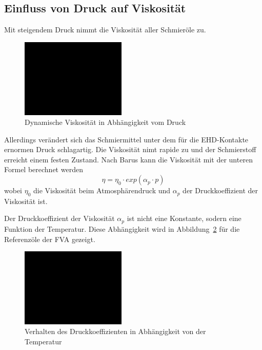 \subsection*{Einfluss von Druck auf Viskosität}
\label{sub:einfluss_von_druck_auf_viskositaet}
Mit steigendem Druck nimmt die Viskosität aller Schmieröle zu.
\begin{figure}[htb]
    \centering
    \includegraphics[width=5cm]{./images/blank_img.jpg}
    \caption{Dynamische Viskosität in Abhängigkeit vom Druck}
    \label{fig:dynamische_viskositaet_in_abhaengigkeit_vom_druck}
\end{figure}
%
Allerdings verändert sich das Schmiermittel unter dem für die EHD-Kontakte ernormen Druck schlagartig.
Die Viskosität nimt rapide zu und der Schmierstoff erreicht einem festen Zustand.
Nach Barus kann die Viskosität mit der unteren Formel berechnet werden
\begin{equation}
    \eta = \eta_0 \cdot exp(\alpha_p \cdot p)
    \label{eq:dynamische_viskositaet_druck_barus}
\end{equation}
%
wobei $\eta_0$ die Viskosität beim Atmosphärendruck und $\alpha_p$ der Druckkoeffizient der Viskosität ist.

Der Druckkoeffizient der Viskosität $\alpha_p$ ist nicht eine Konstante, sodern eine Funktion der Temperatur.
Diese Abhängigkeit wird in Abbildung~\ref{fig:druckkoeffizient_temperatur} für die Referenzöle der FVA gezeigt.
\begin{figure}[htb]
    \centering
    \includegraphics[width=5cm]{./images/blank_img.jpg}
    \caption{Verhalten des Druckkoeffizienten in Abhängigkeit von der Temperatur}
    \label{fig:druckkoeffizient_temperatur}
\end{figure}
%


